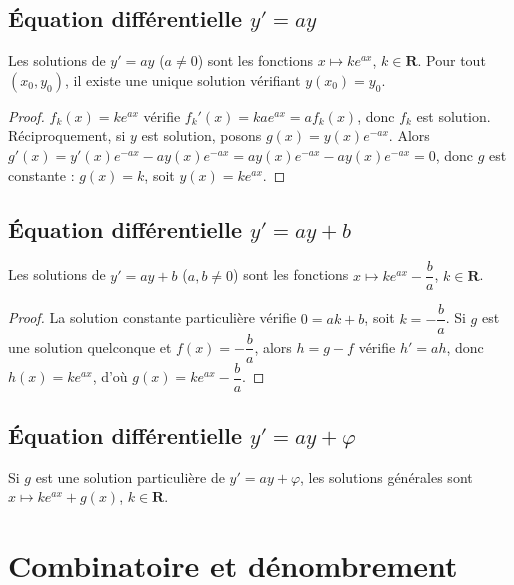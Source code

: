 \documentclass[11pt,a4paper,openany]{book}
\theoremstyle{definition}
\newcommand{\nchap}{
    \setcounter{Définition}{0}
    \setcounter{Propriété}{0}
    \setcounter{Théorème}{0}
    \setcounter{Remarque}{0}
    \setcounter{Exemple}{0}
}
\begin{document}
    \section{Équation différentielle $y'=ay$}
    \begin{Propriété}
        Les solutions de $y'=ay$ ($a\neq 0$) sont les fonctions
        $x\mapsto ke^{ax}$, $k\in\mathbf{R}$.
        Pour tout $(x_0,y_0)$, il existe une unique solution vérifiant $y(x_0)=y_0$.
    \end{Propriété}
    \begin{proof}
        $f_k(x)=ke^{ax}$ vérifie $f_k'(x)=kae^{ax}=af_k(x)$, donc $f_k$ est solution.\\
        Réciproquement, si $y$ est solution, posons $g(x)=y(x)e^{-ax}$.
        Alors $g'(x)=y'(x)e^{-ax}-ay(x)e^{-ax}=ay(x)e^{-ax}-ay(x)e^{-ax}=0$,
        donc $g$ est constante : $g(x)=k$, soit $y(x)=ke^{ax}$.
    \end{proof}

    \section{Équation différentielle $y'=ay+b$}
    \begin{Propriété}
        Les solutions de $y'=ay+b$ ($a,b\neq 0$) sont les fonctions
        $x\mapsto ke^{ax}-\dfrac{b}{a}$, $k\in\mathbf{R}$.
    \end{Propriété}
    \begin{proof}
        La solution constante particulière vérifie $0=ak+b$, soit $k=-\dfrac{b}{a}$.
        Si $g$ est une solution quelconque et $f(x)=-\dfrac{b}{a}$, alors $h=g-f$
        vérifie $h'=a h$, donc $h(x)=ke^{ax}$, d'où $g(x)=ke^{ax}-\dfrac{b}{a}$.
    \end{proof}

    \section{Équation différentielle $y'=ay+\varphi$}
    \begin{Propriété}
        Si $g$ est une solution particulière de $y'=ay+\varphi$, les solutions générales
        sont $x\mapsto ke^{ax}+g(x)$, $k\in\mathbf{R}$.
    \end{Propriété}

    \chapter{Combinatoire et dénombrement}
    \nchap
\end{document}
